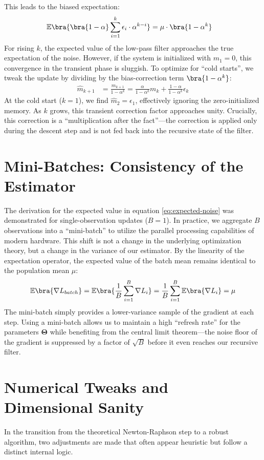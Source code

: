 This leads to the biased expectation:
\begin{align}
	\mathbb{E}\bra{\bra{1-\alpha} \sum_{i=1}^k \epsilon_i \cdot \alpha^{k-i}} &= \mu \cdot \bra{1 - \alpha^k}
\end{align}
For rising $k$, the expected value of the low-pass filter approaches the true expectation of the noise. However, if the system is initialized with $m_1=0$, this convergence in the transient phase is sluggish. To optimize for \enquote{cold starts}, we tweak the update by dividing by the bias-correction term $\bra{1-\alpha^k}$:
\begin{align}
	\hat{m}_{k+1} &= \frac{m_{k+1}}{1-\alpha^k} = \frac{\alpha}{1-\alpha^k} m_k + \frac{1-\alpha}{1-\alpha^k} \epsilon_k
\end{align}
At the cold start ($k=1$), we find $\hat{m}_2 = \epsilon_1$, effectively ignoring the zero-initialized memory. As $k$ grows, this transient correction factor approaches unity. Crucially, this correction is a \enquote{multiplication after the fact}---the correction is applied only during the descent step and is not fed back into the recursive state of the filter.
\section{Mini-Batches: Consistency of the Estimator}
The derivation for the expected value in equation \eqref{eq:expected-noise} was demonstrated for single-observation updates ($B=1$). In practice, we aggregate $B$ observations into a \enquote{mini-batch} to utilize the parallel processing capabilities of modern hardware. This shift is not a change in the underlying optimization theory, but a change in the variance of our estimator. By the linearity of the expectation operator, the expected value of the batch mean remains identical to the population mean $\mu$:
\begin{align}
	\mathbb{E}\bra{\nabla L_{batch}} = \mathbb{E}\bra{\frac{1}{B} \sum_{i=1}^B \nabla L_i} = \frac{1}{B} \sum_{i=1}^B \mathbb{E}\bra{\nabla L_i} = \mu
\end{align}
The mini-batch simply provides a lower-variance sample of the gradient at each step. Using a mini-batch allows us to maintain a high \enquote{refresh rate} for the parameters $\boldsymbol{\Theta}$ while benefiting from the central limit theorem—the noise floor of the gradient is suppressed by a factor of $\sqrt{B}$ before it even reaches our recursive filter.

\section{Numerical Tweaks and Dimensional Sanity}
In the transition from the theoretical Newton-Raphson step to a robust algorithm, two adjustments are made that often appear heuristic but follow a distinct internal logic. 

